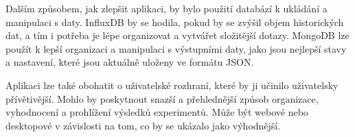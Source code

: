 Dalším způsobem, jak zlepšit aplikaci, by bylo použití databází k ukládání a manipulaci s daty.
InfluxDB by se hodila, pokud by se zvýšil objem historických dat, a tím i potřeba je lépe organizovat a vytvářet složitější dotazy.
MongoDB lze použít k lepší organizaci a manipulaci s výstupními daty, jako jsou nejlepší stavy a nastavení, které jsou aktuálně uloženy ve formátu JSON.

Aplikaci lze také obohatit o uživatelské rozhraní, které by ji učinilo uživatelsky přívětivější.
Mohlo by poskytnout snazší a přehlednější způsob organizace, vyhodnocení a prohlížení výsledků experimentů.
Může být webové nebo desktopové v závislosti na tom, co by se ukázalo jako výhodnější.